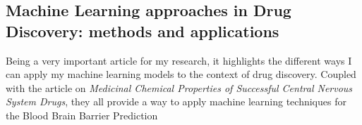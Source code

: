\documentclass[a4paper,12pt]{article}
\begin{document}
		\subsection{Machine Learning approaches in Drug Discovery: methods and applications}
		Being a very important article for my research, it highlights the different ways I can apply my machine learning models to the context of drug discovery. Coupled with the article on \textit{Medicinal Chemical Properties of Successful Central Nervous System Drugs}, they all provide a way to apply machine learning techniques for the Blood Brain Barrier Prediction
	
\newpage


\end{document}
